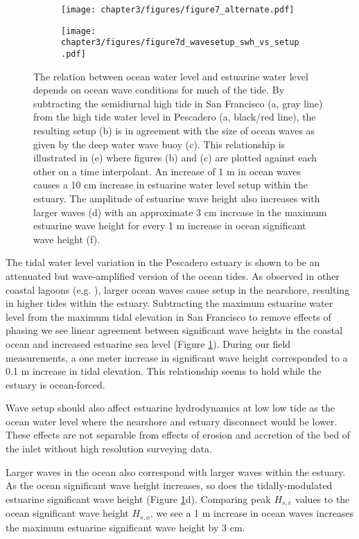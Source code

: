 \begin{figure}
\begin{subfigure}{.666\textwidth}
	\centering
\texttt{[image: chapter3/figures/figure7\_alternate.pdf]}
\end{subfigure}
\begin{subfigure}{.333\textwidth}
\texttt{[image: chapter3/figures/figure7d\_wavesetup\_swh\_vs\_setup.pdf]}
\end{subfigure}
\protect\caption{The relation between ocean water level and estuarine water level depends on ocean wave conditions for much of the tide. By subtracting the
semidiurnal high tide in San Francisco (a, gray line) from the high
tide water level in Pescadero (a, black/red line), the resulting setup
(b) is in agreement with the size of ocean waves as given by the deep
water wave buoy (c). This relationship is illustrated in (e) where
figures (b) and (c) are plotted against each other on a time interpolant.
An increase of 1 m in ocean waves causes a 10 cm increase in estuarine
water level setup within the estuary. The amplitude of estuarine wave
height also increases with larger waves (d) with an approximate 3
cm increase in the maximum estuarine wave height for every 1 m increase
in ocean significant wave height (f). \label{f7_setup}}
\end{figure}


The tidal water level variation in the Pescadero estuary is shown
to be an attenuated but wave-amplified version of the ocean tides.
As observed in other coastal lagoons (e.g. \cite{malhadas_effect_2009}),
larger ocean waves cause setup in the nearshore, resulting in higher
tides within the estuary. Subtracting the maximum estuarine water
level from the maximum tidal elevation in San Francisco to remove
effects of phasing we see linear agreement between significant wave
heights in the coastal ocean and increased estuarine sea level (Figure
\ref{f7_setup}). During our field measurements, a one meter increase
in significant wave height corresponded to a 0.1 m increase in tidal
elevation. This relationship seems to hold while the estuary is ocean-forced. 

Wave setup should also affect estuarine hydrodynamics at low low tide
as the ocean water level where the nearshore and estuary disconnect
would be lower. These effects are not separable from effects of erosion
and accretion of the bed of the inlet without high resolution surveying
data. 

Larger waves in the ocean also correspond with larger waves within
the estuary. As the ocean significant wave height increases, so does
the tidally-modulated estuarine significant wave height (Figure \ref{f7_setup}d).
Comparing peak $H_{s,e}$ values to the ocean significant wave height
$H_{s,o}$, we see a 1 m increase in ocean waves increases the maximum
estuarine significant wave height by 3 cm. 

